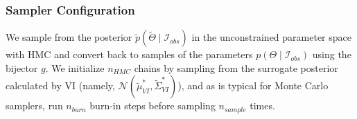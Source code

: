 \subsubsection{Sampler Configuration}\label{sec:hmc-result}
We sample from the posterior $\tilde{p}(\tilde{\Theta} \mid \mathcal{I}_{obs})$ in the unconstrained parameter space with HMC and convert back to samples of the  parameters $p(\Theta \mid \mathcal{I}_{obs})$ using the bijector $g$. 
We initialize $n_{HMC}$ chains by sampling from the surrogate posterior calculated by VI (namely, $\mathcal{N}(\tilde{\mu}^*_{VI},\tilde{\Sigma}^*_{VI})$), 
and as is typical for Monte Carlo samplers, run $n_{burn}$ burn-in steps before sampling $n_{sample}$ times.


